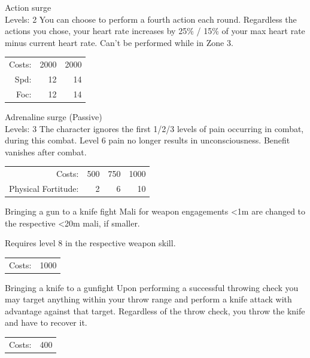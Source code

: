\begin{skill}{Action surge \\\phantom{a}\hfill Levels: 2}
	\setlength{\parskip}{8pt}
	\setlength{\parindent}{0pt}
	You can choose to perform a fourth action each round. Regardless the actions you chose, your heart rate increases by 25\% / 15\% of your max heart rate minus current heart rate. Can't be performed while in Zone 3.\\

	\hfill
	\begin{tabular}{rrr}
		Costs: & 2000 & 2000 \\
		Spd: & 12 & 14 \\
		Foc: & 12 & 14 \\
	\end{tabular}
\end{skill}

\begin{skill}{Adrenaline surge (Passive) \\\phantom{a}\hfill Levels: 3}
	\setlength{\parskip}{8pt}
	\setlength{\parindent}{0pt}
	The character ignores the first 1/2/3 levels of pain occurring in combat, during this combat. Level 6 pain no longer results in unconsciousness. Benefit vanishes after combat.\\

	\hfill
	\begin{tabular}{rrrr}
		Costs: & 500 & 750 & 1000 \\
		Physical Fortitude: & 2 & 6 & 10 \\
	\end{tabular}
\end{skill}

\begin{skill}{Bringing a gun to a knife fight}
	\setlength{\parskip}{8pt}
	\setlength{\parindent}{0pt}
	Mali for weapon engagements <1m are changed to the respective <20m mali, if smaller.

	Requires level 8 in the respective weapon skill.\\

	\hfill
	\begin{tabular}{rr}
		Costs: & 1000 \\
	\end{tabular}
\end{skill}

\begin{skill}{Bringing a knife to a gunfight}
	\setlength{\parskip}{8pt}
	\setlength{\parindent}{0pt}
	Upon performing a successful throwing check you may target anything within your throw range and perform a knife attack with advantage against that target. Regardless of the throw check, you throw the knife and have to recover it.\\

	\hfill
	\begin{tabular}{rr}
		Costs: & 400 \\
	\end{tabular}
\end{skill}

